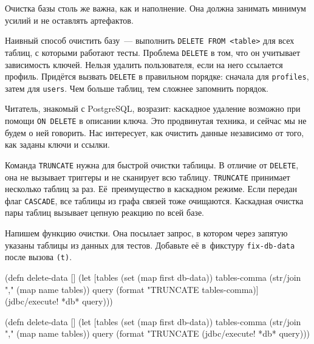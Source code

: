 
Очистка базы столь же важна, как и наполнение. Она должна занимать минимум
усилий и не оставлять артефактов.

Наивный способ очистить базу~--- выполнить \verb|DELETE FROM <table>| для всех
таблиц, с которыми работают тесты. Проблема \verb|DELETE| в том, что он
учитывает зависимость ключей. Нельзя удалить пользователя, если на него
ссылается профиль. Придётся вызвать \verb|DELETE| в правильном порядке:
сначала для \verb|profiles|, затем для \verb|users|. Чем больше таблиц, тем
сложнее запомнить порядок.


Читатель, знакомый с PostgreSQL, возразит: каскадное удаление возможно при
помощи \verb|ON DELETE| в описании ключа. Это продвинутая техника, и сейчас
мы не будем о ней говорить. Нас интересует, как очистить данные независимо от
того, как заданы ключи и ссылки.


Команда \verb|TRUNCATE|  нужна для быстрой очистки таблицы. В
отличие от \verb|DELETE|, она не вызывает триггеры и не сканирует всю
таблицу. \verb|TRUNCATE| принимает несколько таблиц за раз. Её~преимущество в
каскадном режиме. Если передан флаг \verb|CASCADE|, все таблицы из графа связей
тоже очищаются. Каскадная очистка пары таблиц вызывает цепную реакцию по всей
базе.


Напишем функцию очистки. Она посылает запрос, в котором через запятую указаны
таблицы из данных для тестов. Добавьте её в~фикстуру \verb|fix-db-data| после
вызова \verb|(t)|.

\ifx\devicetype\mobile

\begin{english}
  \begin{clojure}
(defn delete-data []
  (let [tables (set (map first db-data))
        tables-comma
        (str/join "," (map name tables))
        query
        (format "TRUNCATE %
          tables-comma)]
    (jdbc/execute! *db* query)))
  \end{clojure}
\end{english}

\else

\begin{english}
  \begin{clojure}
(defn delete-data []
  (let [tables (set (map first db-data))
        tables-comma (str/join "," (map name tables))
        query (format "TRUNCATE %
    (jdbc/execute! *db* query)))
  \end{clojure}
\end{english}

